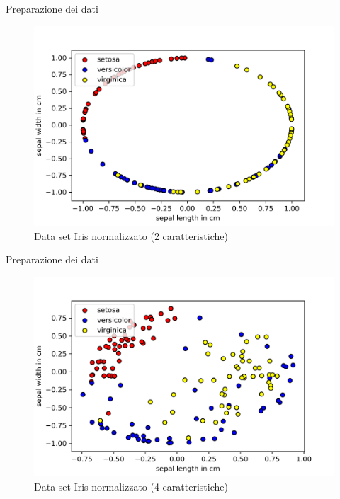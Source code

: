 \documentclass{beamer}
\begin{document}
    \begin{frame}{Preparazione dei dati}
        \begin{figure}[h]
            \centering
            \includegraphics[width=.8\textwidth]{gfx/iris/irisnormalized}
            \caption{Data set Iris normalizzato (2 caratteristiche)}
            \label{}
        \end{figure}
    \end{frame}

    \begin{frame}{Preparazione dei dati}
        \begin{figure}[h]
            \centering
            \includegraphics[width=.8\textwidth]{gfx/iris/iris4normalized}
            \caption{Data set Iris normalizzato (4 caratteristiche)}
            \label{}
        \end{figure}
    \end{frame}
\end{document}
